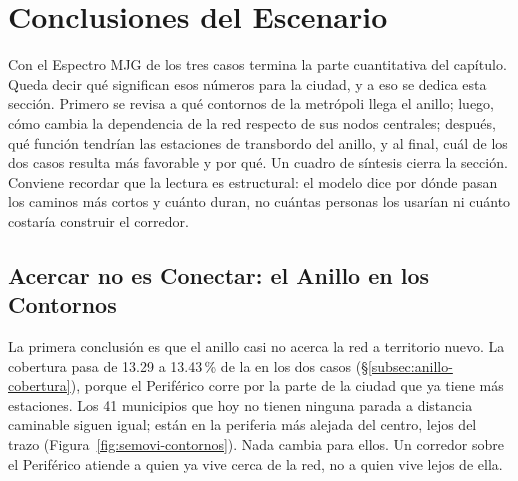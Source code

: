 %
\section{Conclusiones del Escenario}
\label{sec:anillo-conclusiones}

Con el Espectro MJG de los tres casos termina la parte cuantitativa del
capítulo. Queda decir qué significan esos números para la ciudad, y a eso se
dedica esta sección. Primero se revisa a qué contornos de la metrópoli llega el
anillo; luego, cómo cambia la dependencia de la red respecto de sus nodos
centrales; después, qué función tendrían las estaciones de transbordo del
anillo, y al final, cuál de los dos casos resulta más favorable y por qué. Un
cuadro de síntesis cierra la sección. Conviene recordar que la lectura es
estructural: el modelo dice por dónde pasan los caminos más cortos y cuánto
duran, no cuántas personas los usarían ni cuánto costaría construir el corredor.

\subsection{Acercar no es Conectar: el Anillo en los Contornos}
\label{subsec:anillo-conclusiones-contornos}

La primera conclusión es que el anillo casi no acerca la red a territorio nuevo.
La cobertura pasa de 13.29 a 13.43\,\% de la \zmvm{} en los dos casos
(§\ref{subsec:anillo-cobertura}), porque el Periférico corre por la parte de la
ciudad que ya tiene más estaciones. Los 41 municipios que hoy no tienen ninguna
parada a distancia caminable siguen igual; están en la periferia más alejada
del centro, lejos del trazo (Figura~\ref{fig:semovi-contornos}). Nada cambia
para ellos. Un corredor sobre el Periférico atiende a quien
ya vive cerca de la red, no a quien vive lejos de ella.


